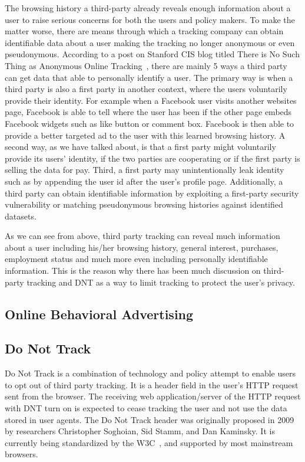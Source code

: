 \documentclass{sig-alternate}
\begin{document}
The browsing history a third-party already reveals enough information about a user to raise serious concerns for both the users and policy makers. To make the matter worse, there are means through which a tracking company can obtain identifiable data about a user making the tracking no longer anonymous or even pseudonymous. According to a post on Stanford CIS blog titled There is No Such Thing as Anonymous Online Tracking~\cite{nosuchthing}, there are mainly 5 ways a third party can get data that able to personally identify a user. The primary way is when a third party is also a first party in another context, where the users voluntarily provide their identity. For example when a Facebook user visits another websites page, Facebook is able to tell where the user has been if the other page embeds Facebook widgets such as like button or comment box. Facebook is then able to provide a better targeted ad to the user with this learned browsing history. A second way, as we have talked about, is that a first party might voluntarily provide its users’ identity, if the two parties are cooperating or if the first party is selling the data for pay. Third, a first party may unintentionally leak identity such as by appending the user id after the user’s profile page. Additionally, a third party can obtain identifiable information by exploiting a first-party security vulnerability or matching pseudonymous browsing histories against identified datasets. 

As we can see from above, third party tracking can reveal much information about a user including his/her browsing history, general interest, purchases, employment status and much more even including personally identifiable information. This is the reason why there has been much discussion on third-party tracking and DNT as a way to limit tracking to protect the user’s privacy.

\subsection*{Online Behavioral Advertising}


\subsection*{Do Not Track}

Do Not Track is a combination of technology and policy attempt to enable users to opt out of third party tracking. It is a header field in the user’s HTTP request sent from the browser. The receiving web application/server of the HTTP request with DNT turn on is expected to cease tracking the user and not use the data stored in user agents. The Do Not Track header was originally proposed in 2009 by researchers Christopher Soghoian, Sid Stamm, and Dan Kaminsky. It is currently being standardized by the W3C~\cite{wikidnt}, and supported by most mainstream browsers. 
\end{document}
